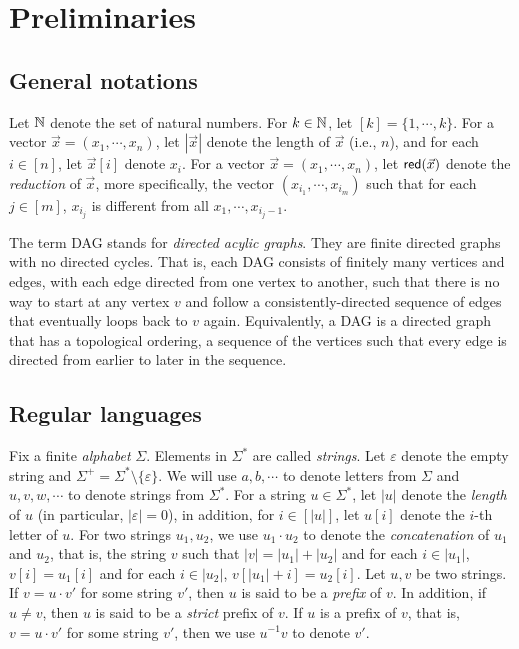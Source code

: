 
\section{Preliminaries}

\subsection*{General notations} 
Let $\mathbb{N}$ denote the set of natural numbers. For $k \in \mathbb{N}$, let $[k] = \{1,\cdots, k\}$. For a vector $\vec{x}=(x_1,\cdots, x_n)$, let $|\vec{x}|$ denote the length of $\vec{x}$ (i.e., $n$), and for each $i \in [n]$, let $\vec{x}[i]$ denote $x_i$. For a vector $\vec{x} = (x_1, \cdots, x_n)$, let $\mathsf{red}(\vec{x})$ denote the \emph{reduction} of $\vec{x}$, more specifically, the vector $(x_{i_1},\cdots, x_{i_m})$ such that for each $j \in [m]$, $x_{i_j}$ is different from all $x_1, \cdots, x_{i_j-1}$.

The term DAG stands for \emph{directed acylic graphs}. They are finite directed graphs with no directed cycles. That is, each DAG consists of finitely many vertices and edges, with each edge directed from one vertex to another, such that there is no way to start at any vertex $v$ and follow a consistently-directed sequence of edges that eventually loops back to $v$ again. Equivalently, a DAG is a directed graph that has a topological ordering, a sequence of the vertices such that every edge is directed from earlier to later in the sequence. 

\subsection*{Regular languages}
Fix a finite \emph{alphabet} $\Sigma$. Elements in $\Sigma^*$ are called \emph{strings}. Let $\varepsilon$ denote the empty string and  $\Sigma^+ = \Sigma^* \setminus \{\varepsilon\}$. We will use $a,b,\cdots$ to denote letters from $\Sigma$ and $u, v, w, \cdots$ to denote strings from $\Sigma^*$. For a string $u \in \Sigma^*$, let $|u|$ denote the \emph{length} of $u$ (in particular, $|\varepsilon|=0$), in addition, for $i \in [|u|]$, let $u[i]$ denote the $i$-th letter of $u$. 
For two strings $u_1, u_2$, we use $u_1 \cdot u_2$ to denote the \emph{concatenation} of $u_1$ and $u_2$, that is, the string $v$ such that $|v|= |u_1| + |u_2|$ and for each $i \in |u_1|$, $v[i]= u_1[i]$ and for each $i \in |u_2|$, $v[|u_1|+i]=u_2[i]$. Let $u, v$ be two strings. If $v = u \cdot v'$ for some string $v'$, then $u$ is said to be a \emph{prefix} of $v$. In addition, if $u \neq v$, then $u$ is said to be a \emph{strict} prefix of $v$. If $u$ is a prefix of $v$, that is, $v = u \cdot v'$ for some string $v'$, then we use $u^{-1} v$ to denote $v'$. 


